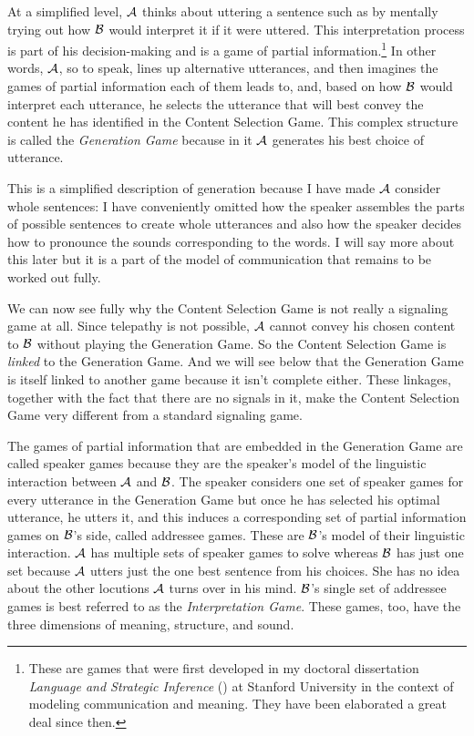 At a simplified level, $\cal A$ thinks about uttering a sentence such as  by mentally trying out how $\cal B$ would interpret it if it were uttered. This interpretation process is part of his decision-making and is a game of partial information.\footnote{These are games that were first developed in my doctoral dissertation \emph{Language and Strategic Inference} (\citeyear{parikh:diss}) at Stanford University in the context of modeling communication and meaning. They have been elaborated a great deal since then.} In other words, $\cal A$, so to speak, lines up alternative utterances, and then imagines the games of partial information each of them leads to, and, based on how $\cal B$ would interpret each utterance, he selects the utterance that will best convey the content he has identified in the Content Selection Game. This complex structure is called the \emph{Generation Game} because in it $\cal A$ generates his best choice of utterance.

This is a simplified description of generation because I have made $\cal A$ consider whole sentences: I have conveniently omitted how the speaker assembles the parts of possible sentences to create whole utterances and also how the speaker decides how to pronounce the sounds corresponding to the words. I will say more about this later but it is a part of the model of communication that remains to be worked out fully.

We can now see fully why the Content Selection Game is not really a \label{page:signaling} signaling game at all. Since telepathy is not possible, $\cal A$ cannot convey his chosen content to $\cal B$ without playing the Generation Game. So the Content Selection Game is \emph{linked} to the Generation Game. And we will see below that the Generation Game is itself linked to another game because it isn't complete either. These linkages, together with the fact that there are no signals in it, make the Content Selection Game very different from a standard signaling game.

The games of partial information that are embedded in the Generation Game are called speaker games \label{page:speaker game} because they are the speaker's model of the linguistic interaction between $\cal A$ and $\cal B$. The speaker considers one set of speaker games for every utterance in the Generation Game but once he has selected his optimal utterance, he utters it, and this induces a corresponding set of partial information games on $\cal B$'s side, called addressee games. These are $\cal B$'s model of their linguistic interaction. $\cal A$ has multiple sets of speaker games to solve whereas $\cal B$ has just one set because $\cal A$ utters just the one best sentence from his choices. She has no idea about the other locutions $\cal A$ turns over in his mind. $\cal B$'s single set of addressee games is best referred to as the \emph{Interpretation Game}. These games, too, have the three dimensions of meaning, structure, and sound.

